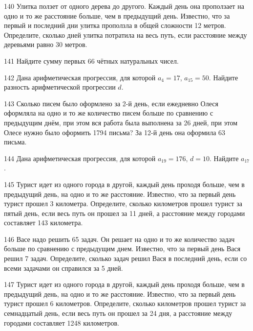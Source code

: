 \documentclass[4apaper]{article}
\begin{document}
\begin{taskBN}{140}
 Улитка ползет от одного дерева до другого. Каждый день она проползает на одно и то же расстояние больше, чем в предыдущий день. Известно, что за первый и последний дни улитка проползла в общей сложности 12 метров. Определите, сколько дней улитка потратила на весь путь, если расстояние между деревьями равно 30 метров.
\end{taskBN}

\begin{taskBN}{141}
Найдите сумму первых 66 чётных натуральных чисел.
\end{taskBN}

\begin{taskBN}{142}
Дана арифметическая прогрессия, для которой $a_{4} = 17$, $a_{15} = 50$. Найдите разность арифметической прогрессии $d$.
\end{taskBN}

\begin{taskBN}{143}
Сколько писем было оформлено за 2-й день, если ежедневно Олеся оформляла на одно и то же количество писем больше по сравнению с предыдущим днём, при этом вся работа была выполнена за 26 дней, при этом Олесе нужно было оформить 1794 письма? За 12-й день она оформила 63 письма. 
\end{taskBN}

\begin{taskBN}{144}
Дана арифметическая прогрессия, для которой $a_{19} = 176$, $d=10$. Найдите $a_{17}$.
\end{taskBN}

\begin{taskBN}{145}
Турист идет из одного города в другой, каждый день проходя больше, чем в предыдущий день, на одно и то же расстояние. Известно, что за первый день турист прошел 3 километра. Определите, сколько километров прошел турист за пятый день, если весь путь он прошел за 11 дней, а расстояние между городами составляет 143 километра.
\end{taskBN}

\begin{taskBN}{146}
Васе надо решить 65 задач. Он решает на одно и то же количество задач больше по сравнению с предыдущим днем. Известно, что за первый день Вася решил 7 задач. Определите, сколько задач решил Вася в последний день, если со всеми задачами он справился за 5 дней.
\end{taskBN}

\begin{taskBN}{147}
Турист идет из одного города в другой, каждый день проходя больше, чем в предыдущий день, на одно и то же расстояние. Известно, что за первый день турист прошел 6 километров. Определите, сколько километров прошел турист за семнадцатый день, если весь путь он прошел за 24 дня, а расстояние между городами составляет 1248 километров.
\end{taskBN}
\end{document}
